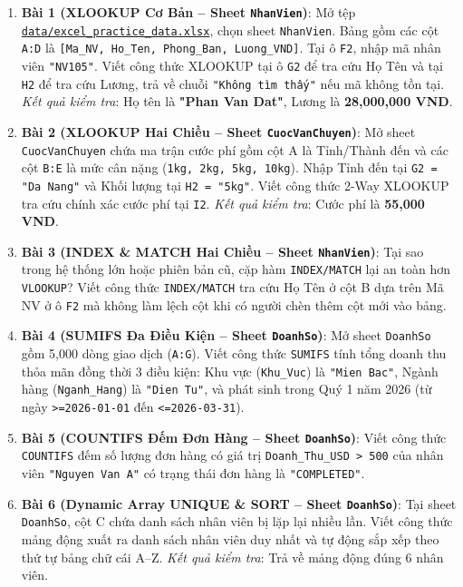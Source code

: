 \begin{baitapbox}
\begin{enumerate}
    \item \textbf{Bài 1 (XLOOKUP Cơ Bản -- Sheet \texttt{NhanVien})}: Mở tệp \href{run:./data/excel_practice_data.xlsx}{\texttt{data/excel\_practice\_data.xlsx}}, chọn sheet \texttt{NhanVien}. Bảng gồm các cột \texttt{A:D} là \texttt{[Ma\_NV, Ho\_Ten, Phong\_Ban, Luong\_VND]}. Tại ô \texttt{F2}, nhập mã nhân viên \texttt{"NV105"}. Viết công thức XLOOKUP tại ô \texttt{G2} để tra cứu Họ Tên và tại \texttt{H2} để tra cứu Lương, trả về chuỗi \texttt{"Không tìm thấy"} nếu mã không tồn tại. \textit{Kết quả kiểm tra}: Họ tên là \textbf{"Phan Van Dat"}, Lương là \textbf{28,000,000 VND}.
    \item \textbf{Bài 2 (XLOOKUP Hai Chiều -- Sheet \texttt{CuocVanChuyen})}: Mở sheet \texttt{CuocVanChuyen} chứa ma trận cước phí gồm cột A là Tỉnh/Thành đến và các cột \texttt{B:E} là mức cân nặng (\texttt{1kg, 2kg, 5kg, 10kg}). Nhập Tỉnh đến tại \texttt{G2 = "Da Nang"} và Khối lượng tại \texttt{H2 = "5kg"}. Viết công thức 2-Way XLOOKUP tra cứu chính xác cước phí tại \texttt{I2}. \textit{Kết quả kiểm tra}: Cước phí là \textbf{55,000 VND}.
    \item \textbf{Bài 3 (INDEX \& MATCH Hai Chiều -- Sheet \texttt{NhanVien})}: Tại sao trong hệ thống lớn hoặc phiên bản cũ, cặp hàm \texttt{INDEX/MATCH} lại an toàn hơn \texttt{VLOOKUP}? Viết công thức \texttt{INDEX/MATCH} tra cứu Họ Tên ở cột B dựa trên Mã NV ở ô \texttt{F2} mà không làm lệch cột khi có người chèn thêm cột mới vào bảng.
    \item \textbf{Bài 4 (SUMIFS Đa Điều Kiện -- Sheet \texttt{DoanhSo})}: Mở sheet \texttt{DoanhSo} gồm 5,000 dòng giao dịch (\texttt{A:G}). Viết công thức \texttt{SUMIFS} tính tổng doanh thu thỏa mãn đồng thời 3 điều kiện: Khu vực (\texttt{Khu\_Vuc}) là \texttt{"Mien Bac"}, Ngành hàng (\texttt{Nganh\_Hang}) là \texttt{"Dien Tu"}, và phát sinh trong Quý 1 năm 2026 (từ ngày \texttt{>=2026-01-01} đến \texttt{<=2026-03-31}).
    \item \textbf{Bài 5 (COUNTIFS Đếm Đơn Hàng -- Sheet \texttt{DoanhSo})}: Viết công thức \texttt{COUNTIFS} đếm số lượng đơn hàng có giá trị \texttt{Doanh\_Thu\_USD > 500} của nhân viên \texttt{"Nguyen Van A"} có trạng thái đơn hàng là \texttt{"COMPLETED"}.
    \item \textbf{Bài 6 (Dynamic Array UNIQUE \& SORT -- Sheet \texttt{DoanhSo})}: Tại sheet \texttt{DoanhSo}, cột C chứa danh sách nhân viên bị lặp lại nhiều lần. Viết công thức mảng động xuất ra danh sách nhân viên duy nhất và tự động sắp xếp theo thứ tự bảng chữ cái A--Z. \textit{Kết quả kiểm tra}: Trả về mảng động đúng 6 nhân viên.

\end{enumerate}
\end{baitapbox}
